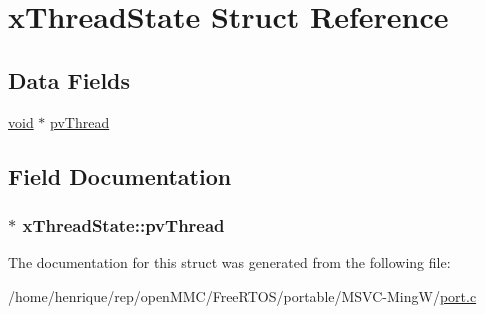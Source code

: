 \hypertarget{structxThreadState}{\section{x\-Thread\-State Struct Reference}
\label{structxThreadState}
}
\subsection*{Data Fields}
\begin{DoxyCompactItemize}
\item 
\hyperlink{Paradigm_2Tern__EE_2small_2portmacro_8h_a14d32f8130d3c0b212cfc751730b5b49}{void} $\ast$ \hyperlink{structxThreadState_a58926367f8af83a4c48ce618ab7f692f}{pv\-Thread}
\end{DoxyCompactItemize}


\subsection{Field Documentation}
\hypertarget{structxThreadState_a58926367f8af83a4c48ce618ab7f692f}{
\subsubsection[{pv\-Thread}]{$\ast$ x\-Thread\-State\-::pv\-Thread}}\label{structxThreadState_a58926367f8af83a4c48ce618ab7f692f}


The documentation for this struct was generated from the following file\-:\begin{DoxyCompactItemize}
\item 
/home/henrique/rep/open\-M\-M\-C/\-Free\-R\-T\-O\-S/portable/\-M\-S\-V\-C-\/\-Ming\-W/\hyperlink{MSVC-MingW_2port_8c}{port.\-c}\end{DoxyCompactItemize}

